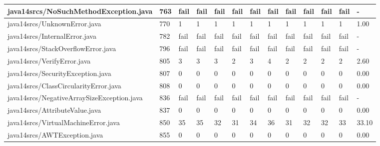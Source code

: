 \begin{tabular}{|l|l|l|l|l|l|l|l|l|l|l|l|l|}
\hline
java14srcs/NoSuchMethodException.java              & 763         & fail      & fail      & fail      & fail      & fail      & fail      & fail      & fail      & fail      & fail      & -         \\
\hline
java14srcs/UnknownError.java                       & 770         & 1         & 1         & 1         & 1         & 1         & 1         & 1         & 1         & 1         & 1         & 1.00      \\
\hline
java14srcs/InternalError.java                      & 782         & fail      & fail      & fail      & fail      & fail      & fail      & fail      & fail      & fail      & fail      & -         \\
\hline
java14srcs/StackOverflowError.java                 & 796         & fail      & fail      & fail      & fail      & fail      & fail      & fail      & fail      & fail      & fail      & -         \\
\hline
java14srcs/VerifyError.java                        & 805         & 3         & 3         & 3         & 2         & 3         & 4         & 2         & 2         & 2         & 2         & 2.60      \\
\hline
java14srcs/SecurityException.java                  & 807         & 0         & 0         & 0         & 0         & 0         & 0         & 0         & 0         & 0         & 0         & 0.00      \\
\hline
java14srcs/ClassCircularityError.java              & 808         & 0         & 0         & 0         & 0         & 0         & 0         & 0         & 0         & 0         & 0         & 0.00      \\
\hline
java14srcs/NegativeArraySizeException.java         & 836         & fail      & fail      & fail      & fail      & fail      & fail      & fail      & fail      & fail      & fail      & -         \\
\hline
java14srcs/AttributeValue.java                     & 837         & 0         & 0         & 0         & 0         & 0         & 0         & 0         & 0         & 0         & 0         & 0.00      \\
\hline
java14srcs/VirtualMachineError.java                & 850         & 35        & 35        & 32        & 31        & 34        & 36        & 31        & 32        & 32        & 33        & 33.10     \\
\hline
java14srcs/AWTException.java                       & 855         & 0         & 0         & 0         & 0         & 0         & 0         & 0         & 0         & 0         & 0         & 0.00      \\

\end{tabular}
